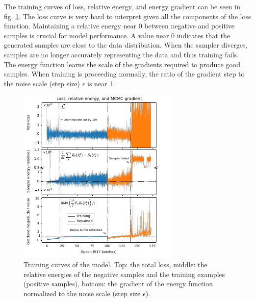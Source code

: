 The training curves of loss, relative energy, and energy gradient can be seen in fig. \ref{fig:losses-energies}. The loss curve is very hard to interpret given all the components of the loss function. Maintaining a relative energy near 0 between negative and positive samples is crucial for model performance. A value near 0 indicates that the generated samples are close to the data distribution. When the sampler diverges, samples are no longer accurately representing the data and thus training fails. The energy function learns the scale of the gradients required to produce good samples. When training is proceeding normally, the ratio of the gradient step to the noise scale (step size) $\epsilon$ is near 1. 

\begin{figure}
	\centering
	\includegraphics[width=\linewidth]{figures/losses-energies-rasterized.pdf}
	\caption[EBM training curves]{\label{fig:losses-energies}Training curves of the model. Top: the total loss, middle: the relative energies of the negative samples and the training examples (positive samples), bottom: the gradient of the energy function normalized to the noise scale (step size $\epsilon$).}
\end{figure}

